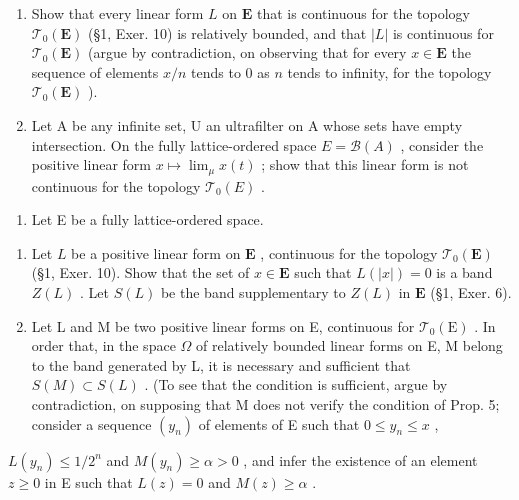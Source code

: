 \begin{enumerate}
\def\labelenumi{\alph{enumi})}
\item
  Show that every linear form \(L\) on \(\mathbf{E}\) that is continuous for the topology \(\mathcal{T}_0(\mathbf{E})\) (§1, Exer. 10) is relatively bounded, and that \(|L|\) is continuous for \(\mathcal{T}_0(\mathbf{E})\) (argue by contradiction, on observing that for every \(x \in \mathbf{E}\) the sequence of elements \(x / n\) tends to 0 as \(n\) tends to infinity, for the topology \(\mathcal{T}_0(\mathbf{E})\) ).
\item
  Let A be any infinite set, U an ultrafilter on A whose sets have empty intersection. On the fully lattice-ordered space \(E = \mathcal{B}(A)\) , consider the positive linear form \(x \mapsto \lim_{\mu} x(t)\) ; show that this linear form is not continuous for the topology \(\mathcal{T}_{0}(E)\) .
\end{enumerate}

\begin{enumerate}
\def\labelenumi{\arabic{enumi})}
\setcounter{enumi}{3}
\tightlist
\item
  Let E be a fully lattice-ordered space.
\end{enumerate}

\begin{enumerate}
\def\labelenumi{\alph{enumi})}
\item
  Let \(L\) be a positive linear form on \(\mathbf{E}\) , continuous for the topology \(\mathcal{T}_0(\mathbf{E})\) (§1, Exer. 10). Show that the set of \(x \in \mathbf{E}\) such that \(L(|x|) = 0\) is a band \(Z(L)\) . Let \(S(L)\) be the band supplementary to \(Z(L)\) in \(\mathbf{E}\) (§1, Exer. 6).
\item
  Let L and M be two positive linear forms on E, continuous for \(\mathcal{T}_{0}(\mathrm{E})\) . In order that, in the space \(\Omega\) of relatively bounded linear forms on E, M belong to the band generated by L, it is necessary and sufficient that \(S(M) \subset S(L)\) . (To see that the condition is sufficient, argue by contradiction, on supposing that M does not verify the condition of Prop. 5; consider a sequence \((y_{n})\) of elements of E such that \(0 \leqslant y_{n} \leqslant x\) ,
\end{enumerate}

\(L(y_{n}) \leqslant 1 / 2^{n}\) and \(M(y_{n}) \geqslant \alpha > 0\) , and infer the existence of an element \(z \geqslant 0\) in E such that \(L(z) = 0\) and \(M(z) \geqslant \alpha\) .

